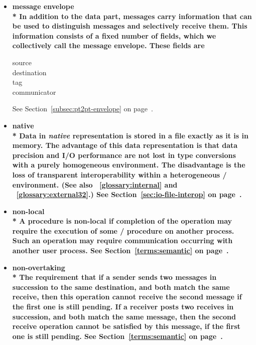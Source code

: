 \begin{itemize}
\label{glossary:message_envelope}
\item \bf{ message envelope} \\*
In addition to the data part, messages carry information that can be used to
distinguish messages and selectively receive them.  This information consists
of a fixed number of fields, which we collectively call
the {\bf message envelope}.   These fields are
\begin{center}
source \\
destination \\
tag \\
communicator
\end{center}
See Section~\ref{subsec:pt2pt-envelope} on page~\pageref{subsec:pt2pt-envelope}.

\label{glossary:native}
\item \bf{ native} \\*
Data in \emph{native} representation is stored in a file exactly
as it is in memory.
The advantage of this data representation is that
data precision and I/O performance are not lost in type conversions
with a purely homogeneous environment.
The disadvantage is the loss of transparent interoperability within a
heterogeneous \MPI/ environment.
(See also ~\ref{glossary:internal} and ~\ref{glossary:external32}.)
See Section~\ref{sec:io-file-interop} on page~\pageref{sec:io-file-interop}.

\label{glossary:non-local}
\item \bf{ non-local} \\*
A procedure is non-local if completion of the operation may require
the execution of some \MPI/ procedure on another process.  Such an
operation may require
communication occurring with another user process.
See Section~\ref{terms:semantic} on page~\pageref{terms:semantic}.

\label{glossary:non-overtaking}
\item \bf{ non-overtaking} \\* 
The requirement that
if a sender sends two messages in succession to the same destination, and
both match the same receive, then this operation cannot receive the
second message if the first one is still pending.
If a receiver posts two receives in succession, and both match the same
message,
then the second receive operation cannot be satisfied by this message, if the
first one is still pending.
See Section~\ref{terms:semantic} on page~\pageref{terms:semantic}.


\end{itemize}
